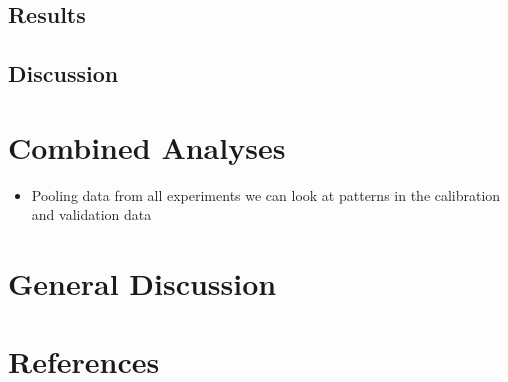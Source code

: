 \documentclass[
  man,floatsintext]{apa6}
\providecommand{\tightlist}{%
  \setlength{\itemsep}{0pt}\setlength{\parskip}{0pt}}
\begin{document}
\hypertarget{results-4}{%
\subsection{Results}\label{results-4}}

\hypertarget{discussion-4}{%
\subsection{Discussion}\label{discussion-4}}

\hypertarget{combined-analyses}{%
\section{Combined Analyses}\label{combined-analyses}}

\begin{itemize}
\tightlist
\item
  Pooling data from all experiments we can look at patterns in the calibration and validation data
\end{itemize}

\hypertarget{general-discussion}{%
\section{General Discussion}\label{general-discussion}}

\newpage

\hypertarget{references}{%
\section{References}\label{references}}

\begingroup
\setlength{\parindent}{-0.5in}
\setlength{\leftskip}{0.5in}
\end{document}
